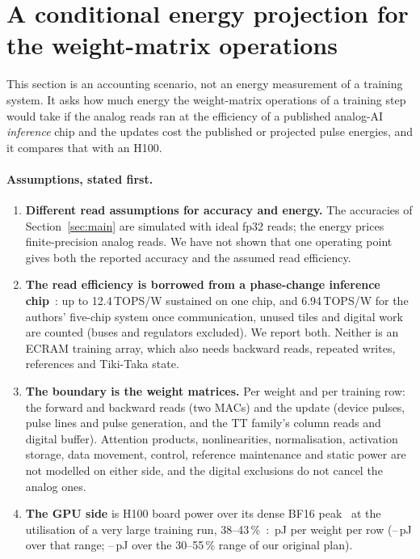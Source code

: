 \section{A conditional energy projection for the weight-matrix operations}\label{sec:energy}
This section is an accounting scenario, not an energy measurement of a training system. It asks how much energy the
weight-matrix operations of a training step would take if the analog reads ran at the efficiency of a published analog-AI
\emph{inference} chip and the updates cost the published or projected pulse energies, and it compares that with an H100.

\paragraph{Assumptions, stated first.}
\begin{enumerate}
\item \textbf{Different read assumptions for accuracy and energy.} The accuracies of Section~\ref{sec:main} are simulated with
      ideal fp32 reads; the energy prices finite-precision analog reads. We have not shown that one operating point gives both
      the reported accuracy and the assumed read efficiency.
\item \textbf{The read efficiency is borrowed from a phase-change inference chip}~\cite{ambrogio2023}: up to 12.4\,TOPS/W
      sustained on one chip, and 6.94\,TOPS/W for the authors' five-chip system once communication, unused tiles and digital
      work are counted (buses and regulators excluded). We report both. Neither is an ECRAM training array, which also needs
      backward reads, repeated writes, references and Tiki-Taka state.
\item \textbf{The boundary is the weight matrices.} Per weight and per training row: the forward and backward reads (two MACs)
      and the update (device pulses, pulse lines and pulse generation, and the TT family's column reads and digital buffer).
      Attention products, nonlinearities, normalisation, activation storage, data movement, control, reference maintenance and
      static power are not modelled on either side, and the digital exclusions do not cancel the analog ones.
\item \textbf{The GPU side} is H100 board power over its dense BF16 peak~\cite{nvidiah100} at the utilisation of a very large
      training run, 38--43\,\%~\cite{dubey2024}: \RVenGpuPj\,pJ per weight per row (\RVenGpuMeasLo--\RVenGpuMeasHi\,pJ over that
      range; \RVenGpuPlannedLo--\RVenGpuPlannedHi\,pJ over the 30--55\,\% range of our original plan).
\end{enumerate}

